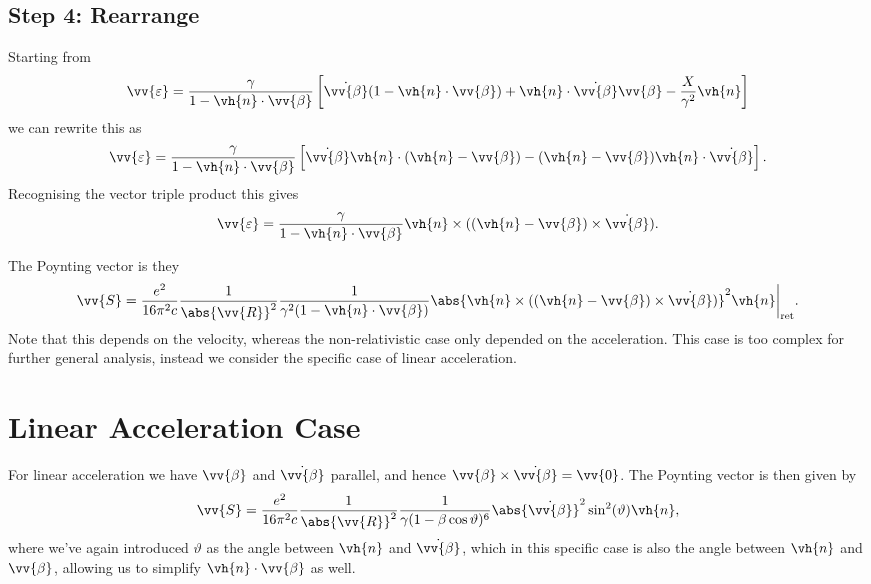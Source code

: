 \documentclass[fleqn]{NotesClass}
\newcommand*{\ret}{{\text{ret}}}
\begin{document}
    \subsection{Step 4: Rearrange}
    Starting from
    \begin{equation}
        \vv{\varepsilon} = \frac{\gamma}{1 - \vh{n} \cdot \vv{\beta}} \left[ \dot{\vv{\beta}} (1 - \vh{n} \cdot \vv{\beta}) + \vh{n} \cdot \dot{\vv{\beta}} \vv{\beta} - \frac{X}{\gamma^2}\vh{n} \right]
    \end{equation}
    we can rewrite this as
    \begin{equation}
        \vv{\varepsilon} = \frac{\gamma}{1 - \vh{n} \cdot \vv{\beta}} \left[ \dot{\vv{\beta}} \vh{n} \cdot (\vh{n} - \vv{\beta}) - (\vh{n} - \vv{\beta}) \vh{n} \cdot \dot{\vv{\beta}} \right].
    \end{equation}
    Recognising the vector triple product this gives
    \begin{equation}
        \vv{\varepsilon} = \frac{\gamma}{1 - \vh{n} \cdot \vv{\beta}} \vh{n} \times ((\vh{n} - \vv{\beta}) \times \dot{\vv{\beta}}).
    \end{equation}
    
    The Poynting vector is they
    \begin{equation}
        \vv{S} = \frac{e^2}{16\pi^2 c} \frac{1}{\abs{\vv{R}}^2} \frac{1}{\gamma^2(1 - \vh{n} \cdot \vv{\beta})} \abs{\vh{n} \times ((\vh{n} - \vv{\beta}) \times \dot{\vv{\beta}})}^2 \vh{n} \bigg|_{\ret}.
    \end{equation}
    Note that this depends on the velocity, whereas the non-relativistic case only depended on the acceleration.
    This case is too complex for further general analysis, instead we consider the specific case of linear acceleration.
    
    \section{Linear Acceleration Case}
    For linear acceleration we have \(\vv{\beta}\) and \(\dot{\vv{\beta}}\) parallel, and hence \(\vv{\beta} \times \dot{\vv{\beta}} = \vv{0}\).
    The Poynting vector is then given by
    \begin{equation}
        \vv{S} = \frac{e^2}{16\pi^2 c} \frac{1}{\abs{\vv{R}}^2} \frac{1}{\gamma(1 - \beta \cos \vartheta)^6} \abs{\dot{\vv{\beta}}}^2 \sin^2(\vartheta) \vh{n},
    \end{equation}
    where we've again introduced \(\vartheta\) as the angle between \(\vh{n}\) and \(\dot{\vv{\beta}}\), which in this specific case is also the angle between \(\vh{n}\) and \(\vv{\beta}\), allowing us to simplify \(\vh{n} \cdot \vv{\beta}\) as well.
    
\end{document}

